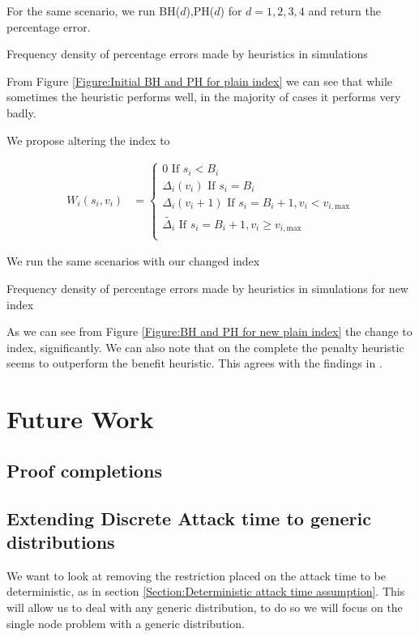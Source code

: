 \documentclass[a4paper,10pt]{article}
\theoremstyle{definition}
\theoremstyle{definition}
\theoremstyle{remark}
\theoremstyle{definition}
\begin{document}
For the same scenario, we run BH($d$),PH($d$) for $d=1,2,3,4$ and return the percentage error.

\begin{myfigure}
\label{Figure:Initial BH and PH for plain index}

\caption{Frequency density of percentage errors made by heuristics in simulations}
\end{myfigure}

From Figure \ref{Figure:Initial BH and PH for plain index} we can see that while sometimes the heuristic performs well, in the majority of cases it performs very badly.

We propose altering the index to

\begin{align}
W_{i}(s_{i},v_{i})&=\begin{cases}
0 \text{ If } s_{i}<B_{i} \\
\Delta_{i}(v_{i}) \text{ If } s_{i}=B_{i} \\
\Delta_{i}(v_{i}+1) \text{ If } s_{i}=B_{i}+1 , v_{i} < v_{i,\text{max}} \\
\widetilde{\Delta_{i}} \text{ If } s_{i}=B_{i}+1, v_{i} \geq v_{i,\text{max}} \\
\end{cases}
\end{align}

We run the same scenarios with our changed index

\begin{myfigure}
\label{Figure:BH and PH for new plain index}

\caption{Frequency density of percentage errors made by heuristics in simulations for new index}
\end{myfigure}

As we can see from Figure \ref{Figure:BH and PH for new plain index} the change to index, significantly. We can also note that on the complete the penalty heuristic seems to outperform the benefit heuristic. This agrees with the findings in \cite{Lin2013}.

\section{Future Work}
\label{Section:Future Work}
\subsection{Proof completions}

\subsection{Extending Discrete Attack time to generic distributions}
We want to look at removing the restriction placed on the attack time to be deterministic, as in section \ref{Section:Deterministic attack time assumption}. This will allow us to deal with any generic distribution, to do so we will focus on the single node problem with a generic distribution.
\end{document}

